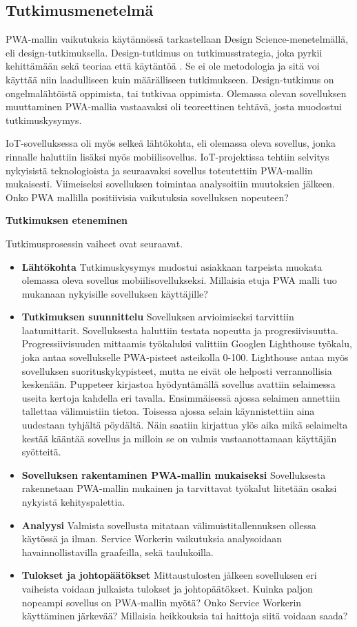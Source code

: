 \documentclass{tktltiki}
\begin{document}
\subsection{Tutkimusmenetelmä}

PWA-mallin vaikutuksia käytännössä tarkastellaan Design Science-menetelmällä, eli design-tutkimuksella. Design-tutkimus on tutkimusstrategia, joka pyrkii kehittämään sekä teoriaa että käytäntöä \cite{ponka}. Se ei ole metodologia ja sitä voi käyttää niin laadulliseen kuin määrälliseen tutkimukseen. Design-tutkimus on ongelmalähtöistä oppimista, tai tutkivaa oppimista. Olemassa olevan sovelluksen muuttaminen PWA-mallia vastaavaksi oli teoreettinen tehtävä, josta muodostui tutkimuskysymys. 

IoT-sovelluksessa oli myös selkeä lähtökohta, eli olemassa oleva sovellus, jonka rinnalle haluttiin lisäksi myös mobiilisovellus. IoT-projektissa tehtiin selvitys nykyisistä teknologioista ja seuraavaksi sovellus toteutettiin PWA-mallin mukaisesti. Viimeiseksi sovelluksen toimintaa analysoitiin muutoksien jälkeen. Onko PWA mallilla positiivisia vaikutuksia sovelluksen nopeuteen?

\textbf{Tutkimuksen eteneminen}

Tutkimusprosessin vaiheet ovat seuraavat.

\begin{itemize}
  \item \textbf{Lähtökohta} Tutkimuskysymys mudostui asiakkaan tarpeista muokata olemassa oleva sovellus mobiilisovellukseksi. Millaisia etuja PWA malli tuo mukanaan nykyisille sovelluksen käyttäjille?
  \item \textbf{Tutkimuksen suunnittelu} Sovelluksen arvioimiseksi tarvittiin laatumittarit. Sovelluksesta haluttiin testata nopeutta ja progresiivisuutta. Progressiivisuuden mittaamis työkaluksi valittiin Googlen Lighthouse työkalu, joka antaa sovellukselle PWA-pisteet asteikolla 0-100. Lighthouse antaa myös sovelluksen suorituskykypisteet, mutta ne eivät ole helposti verrannollisia keskenään. Puppeteer kirjastoa hyödyntämällä sovellus avattiin selaimessa useita kertoja kahdella eri tavalla. Ensimmäisessä ajossa selaimen annettiin tallettaa välimuistiin tietoa. Toisessa ajossa selain käynnistettiin aina uudestaan tyhjältä pöydältä. Näin saatiin kirjattua ylös aika mikä selaimelta kestää kääntää sovellus ja milloin se on valmis vastaanottamaan käyttäjän syötteitä. 
  \item \textbf{Sovelluksen rakentaminen PWA-mallin mukaiseksi} Sovelluksesta rakennetaan PWA-mallin mukainen ja tarvittavat työkalut liitetään osaksi nykyistä kehityspalettia.
  \item \textbf{Analyysi} Valmista sovellusta mitataan välimuistitallennuksen ollessa käytössä ja ilman. Service Workerin vaikutuksia analysoidaan havainnollistavilla graafeilla, sekä taulukoilla.
  \item \textbf{Tulokset ja johtopäätökset} Mittaustulosten jälkeen sovelluksen eri vaiheista voidaan julkaista tulokset ja johtopäätökset. Kuinka paljon nopeampi sovellus on PWA-mallin myötä? Onko Service Workerin käyttäminen järkevää? Millaisia heikkouksia tai haittoja siitä voidaan saada?
\end{itemize}
\end{document}
